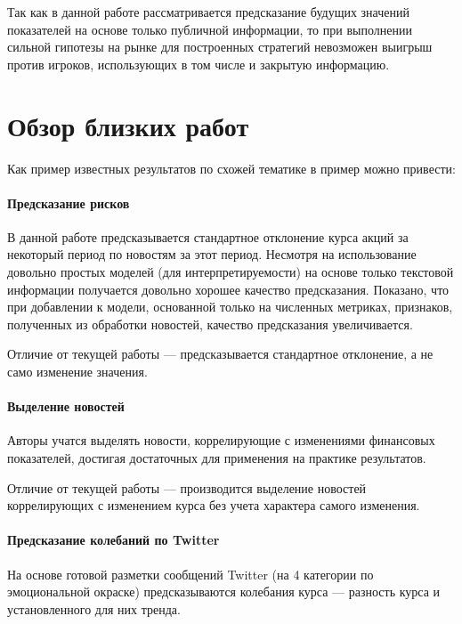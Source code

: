 \documentclass[pdftex,ptm,14pt,a4paper]{extreport}
\begin{document}
Так как в данной работе рассматривается предсказание будущих значений показателей на основе только публичной информации,
то при выполнении сильной гипотезы на рынке для построенных стратегий невозможен выигрыш против игроков, использующих в том
числе и закрытую информацию.

\section{Обзор близких работ}

Как пример известных результатов по схожей тематике в пример можно привести:

\paragraph{Предсказание рисков \cite{risk_predict}}

В данной работе предсказывается стандартное отклонение курса акций за некоторый период по новостям за этот период.
Несмотря на использование довольно простых моделей (для интерпретируемости) на основе только текстовой информации получается
довольно хорошее качество предсказания. Показано, что при добавлении к модели, основанной только на численных метриках,
 признаков, полученных из обработки новостей, качество предсказания увеличивается.

Отличие от текущей работы --- предсказывается стандартное отклонение, а не само изменение значения.

\paragraph{Выделение новостей \cite{select_important_news}}

Авторы учатся выделять новости, коррелирующие с изменениями финансовых показателей, достигая достаточных для
применения на практике результатов.

Отличие от текущей работы --- производится выделение новостей коррелирующих с изменением курса без учета характера
самого изменения.

\paragraph{Предсказание колебаний по Twitter \cite{stock_from_twitter}}

На основе готовой разметки сообщений Twitter (на 4 категории по эмоциональной окраске) предсказываются колебания курса --- разность курса и установленного для них тренда.
\end{document}
